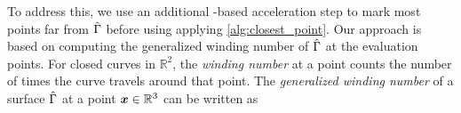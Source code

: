 To address this, we use an additional \fmm-based acceleration step to mark most points far from $\hat{\Gamma}$ before using applying \cref{alg:closest_point}. 
Our approach is based on computing the generalized winding number \cite{jacobson2013robust} of $\hat{\Gamma}$ at the evaluation points. 
For closed curves in $\mathbb{R}^2$, the \textit{winding number} at a point counts the number of times the curve travels around that point. 
The \textit{generalized winding number} of a surface $\hat{\Gamma}$ at a point ${\bm{x}} \in \mathbb{R}^3$ can be written as 
%



